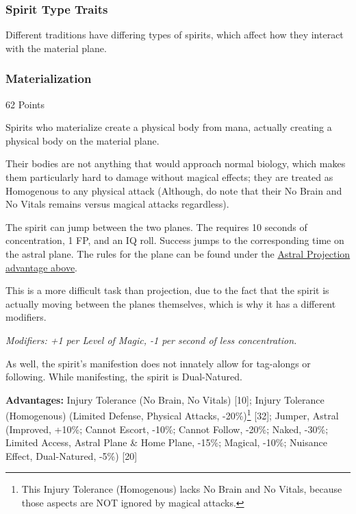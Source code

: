 \begin{multicols*}{3}
	
	\subsubsection{Spirit Type Traits}
	
	Different traditions have differing types of spirits, which affect how they interact with the material plane.
	
	\subsubsection*{Materialization}\label{materialization}
	\begin{flushright}
		62 Points
	\end{flushright}
	
	Spirits who materialize create a physical body from mana, actually creating a physical body on the material plane. 
	
	Their bodies are not anything that would approach normal biology, which makes them particularly hard to damage without magical effects; they are treated as Homogenous to any physical attack (Although, do note that their No Brain and No Vitals remains versus magical attacks regardless).
	
	The spirit can jump between the two planes. The requires 10 seconds of concentration, 1 FP, and an IQ roll. Success jumps to the corresponding time on the astral plane. The rules for the plane can be found under the \hyperref[astral_projection]{Astral Projection advantage above}. 
	
	This is a more difficult task than projection, due to the fact that the spirit is actually moving between the planes themselves, which is why it has a different modifiers. 
	
	\textit{\textcolor{NavyBlue}{Modifiers: +1 per Level of Magic, -1 per second of less concentration.}}
	
	As well, the spirit's manifestion does not innately allow for tag-alongs or following. While manifesting, the spirit is Dual-Natured.
	
	\textbf{Advantages:} 
	Injury Tolerance (No Brain, No Vitals) [10]; Injury Tolerance (Homogenous) (Limited Defense, Physical Attacks, -20\%)\footnote{This Injury Tolerance (Homogenous) lacks No Brain and No Vitals, because those aspects are NOT ignored by magical attacks.} [32]; Jumper, Astral (Improved, +10\%; Cannot Escort, -10\%; Cannot Follow, -20\%; Naked, -30\%; Limited Access, Astral Plane \& Home Plane, -15\%; Magical, -10\%; Nuisance Effect, Dual-Natured, -5\%) [20]
	

\end{multicols*}
